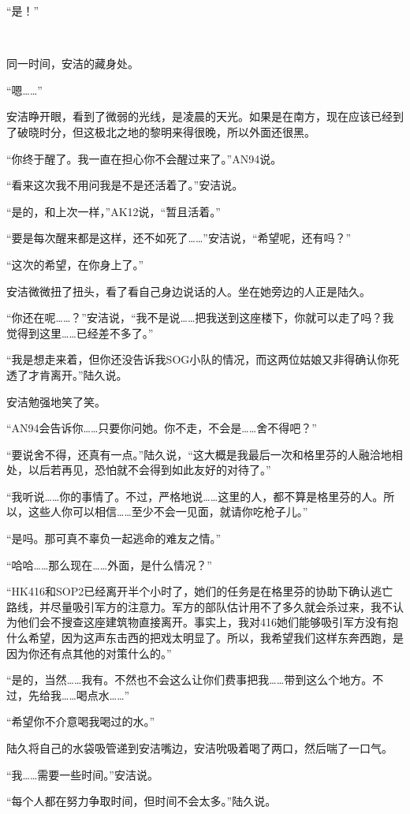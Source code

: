 “是！”

 

同一时间，安洁的藏身处。

“嗯……” 

安洁睁开眼，看到了微弱的光线，是凌晨的天光。如果是在南方，现在应该已经到了破晓时分，但这极北之地的黎明来得很晚，所以外面还很黑。

“你终于醒了。我一直在担心你不会醒过来了。”AN94说。

“看来这次我不用问我是不是还活着了。”安洁说。

“是的，和上次一样，”AK12说，“暂且活着。”

“要是每次醒来都是这样，还不如死了……”安洁说，“希望呢，还有吗？”

“这次的希望，在你身上了。”

安洁微微扭了扭头，看了看自己身边说话的人。坐在她旁边的人正是陆久。

“你还在呢……？”安洁说，“我不是说……把我送到这座楼下，你就可以走了吗？我觉得到这里……已经差不多了。”

“我是想走来着，但你还没告诉我SOG小队的情况，而这两位姑娘又非得确认你死透了才肯离开。”陆久说。

安洁勉强地笑了笑。

“AN94会告诉你……只要你问她。你不走，不会是……舍不得吧？”

“要说舍不得，还真有一点。”陆久说，“这大概是我最后一次和格里芬的人融洽地相处，以后若再见，恐怕就不会得到如此友好的对待了。”

“我听说……你的事情了。不过，严格地说……这里的人，都不算是格里芬的人。所以，这些人你可以相信……至少不会一见面，就请你吃枪子儿。”

“是吗。那可真不辜负一起逃命的难友之情。”

“哈哈……那么现在……外面，是什么情况？”

“HK416和SOP2已经离开半个小时了，她们的任务是在格里芬的协助下确认逃亡路线，并尽量吸引军方的注意力。军方的部队估计用不了多久就会杀过来，我不认为他们会不搜查这座建筑物直接离开。事实上，我对416她们能够吸引军方没有抱什么希望，因为这声东击西的把戏太明显了。所以，我希望我们这样东奔西跑，是因为你还有点其他的对策什么的。”

“是的，当然……我有。不然也不会这么让你们费事把我……带到这么个地方。不过，先给我……喝点水……”

“希望你不介意喝我喝过的水。”

陆久将自己的水袋吸管递到安洁嘴边，安洁吮吸着喝了两口，然后喘了一口气。

“我……需要一些时间。”安洁说。

“每个人都在努力争取时间，但时间不会太多。”陆久说。

